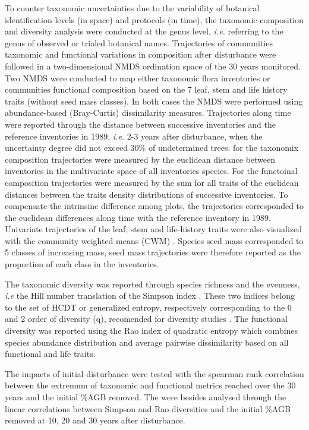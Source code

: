 \documentclass[fleqn,10pt]{ArtEcoFoG} %
\theoremstyle{definition}
\theoremstyle{definition}
\theoremstyle{definition}
\theoremstyle{remark}
\begin{document}
To counter taxonomic uncertainties due to the variability of botanical
identification levels (in space) and protocols (in time), the taxonomic
composition and diversity analysis were conducted at the genus level,
\emph{i.e.} referring to the genus of observed or trialed botanical
names. Trajectories of communities taxonomic and functional variations
in composition after disturbance were followed in a two-dimensional NMDS
ordination space of the 30 years monitored. Two NMDS were conducted to
map either taxonomic flora inventories or communities functional
composition based on the 7 leaf, stem and life history traits (without
seed mass classes). In both cases the NMDS were performed using
abundance-based (Bray-Curtis) dissimilarity measures. Trajectories along
time were reported through the distance between successive inventories
and the reference inventories in 1989, \emph{i.e.} 2-3 years after
disturbance, when the uncertainty degree did not exceed 30\% of
undetermined trees. for the taxonomix composition trajectories were
measured by the euclidean distance between inventories in the
multivariate space of all inventories species. For the functoinal
composition trajectories were measured by the sum for all traits of the
euclidean distances between the traits density distributions of
successive inventories. To compensate the intrinsinc difference among
plots, the trajectories corresponded to the euclidean differences along
time with the reference inventory in 1989. Univariate trajectories of
the leaf, stem and life-history traits were also visualized with the
community weighted means (CWM) \citep{Diaz2007, Garnier2004}. Species
seed mass corresponded to 5 classes of increasing mass, seed mass
trajectories were therefore reported as the proportion of each class in
the inventories.

The taxonomic diversity was reported through species richness and the
evenness, \emph{i.e} the Hill number translation of the Simpson index
\citep{Hill1973}. These two indices belong to the set of HCDT or
generalized entropy, respectively corresponding to the 0 and 2 order of
diversity (q), recomended for diversity studies
\citep{Patil1982, Tothmeresz1995, Marcon2015}. The functional diversity
was reported using the Rao index of quadratic entropy which combines
species abundance distribution and average pairwise dissimilarity based
on all functional and life traits.

The impacts of initial disturbance were tested with the spearman rank
correlation between the extremum of taxonomic and functional metrics
reached over the 30 years and the initial \%AGB removed. The were
besides analysed through the linear correlations between Simpson and Rao
diversities and the initial \%AGB removed at 10, 20 and 30 years after
disturbance.
\end{document}
